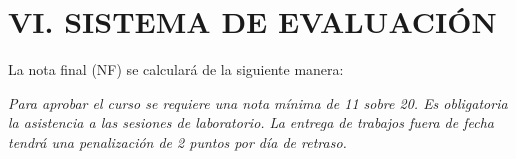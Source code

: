 \documentclass[12pt,a4paper]{article}
\begin{document}
\section*{VI. SISTEMA DE EVALUACIÓN}
La nota final (NF) se calculará de la siguiente manera:


\textit{Para aprobar el curso se requiere una nota mínima de 11 sobre 20. Es obligatoria la asistencia a las sesiones de laboratorio. La entrega de trabajos fuera de fecha tendrá una penalización de 2 puntos por día de retraso.}
\vspace{0.5cm}

\end{document}
